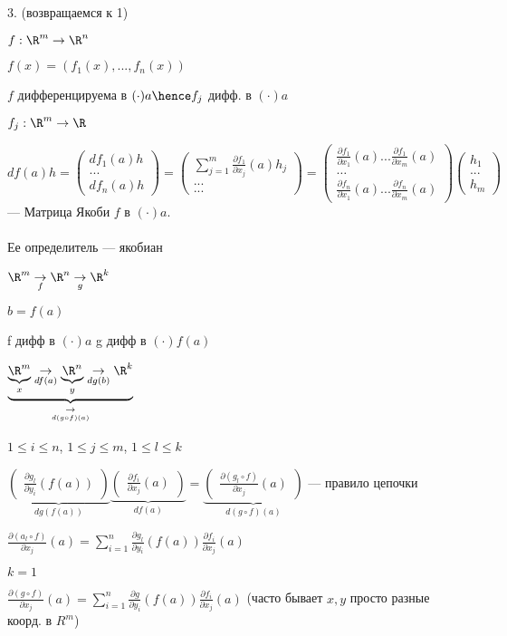 3. (возвращаемся к 1)

$f : \R ^ m \to \R^n$

$f(x) = (f_1(x), ..., f_n(x))$

$f$ дифференцируема в $(\cdot) a \hence f_j$ дифф. в $(\cdot) a$


$f_j : \R^ m \to \R$

$df(a)h = \begin{pmatrix}
    df_1(a)h\\
    ...\\
    df_n(a)h
\end{pmatrix} = \begin{pmatrix}
    \sum_{j=1}^m \frac{\partial f_1}{\partial x_j}(a) h_j\\
    ...\\
    ... 
\end{pmatrix} = \begin{pmatrix}
    \frac{\partial f_1}{\partial x_1}(a) ... \frac{\partial f_1}{\partial x_m}(a) \\
    \dots \\
    \frac{\partial f_n}{\partial x_1}(a) ... \frac{\partial f_n}{\partial x_m}(a) 
\end{pmatrix} \begin{pmatrix}
    h_1\\
    ...\\
    h_m
\end{pmatrix}$ --- Матрица Якоби $f$ в $(\cdot) a$. \\ \\ Ее определитель --- якобиан


$\R^m \underset{f}{\to} \R^n \underset{g}{\to}  \R ^ k$

$b = f(a)$

f дифф в $(\cdot) a$
g дифф в $(\cdot) f(a)$

$\underbrace{\underbrace{\R ^ m}_{x} \underset{df(a)}{\to} \underbrace{\R ^ n}_{y} \underset{dg(b)}{\to} \R ^ k}_{\underset{d(g\circ f)(a)}{\to}}$

$1 \leqslant i \leqslant n$,
$1 \leqslant j \leqslant m$,
$1 \leqslant l \leqslant k$

$\underbrace{\begin{pmatrix}
    \frac{\partial g_l}{\partial y_i}(f(a))
\end{pmatrix}}_{dg(f(a))} \underbrace{\begin{pmatrix}
    \frac{\partial f_i}{\partial x_j}(a)
\end{pmatrix}}_{df(a)} = \underbrace{\begin{pmatrix}
    \frac{\partial (g_l \circ f)}{\partial x_j}(a)
\end{pmatrix}}_{d(g \circ f)(a)}$ --- правило цепочки

$\frac{\partial (a_l \circ f)}{\partial x_j}(a) = \sum_{i = 1}^{n} \frac{\partial g_l}{\partial y_i}(f(a)) \frac{\partial f_i}{\partial x_j}(a)$


$k = 1$

$\frac{\partial (g \circ f)}{\partial x_j}(a) = \sum_{i = 1} ^ n \frac{\partial g}{\partial y_i}(f(a)) \frac{\partial f_i}{\partial x_j}(a)$ (часто бывает $x, y$ просто разные коорд. в $R ^ m$)